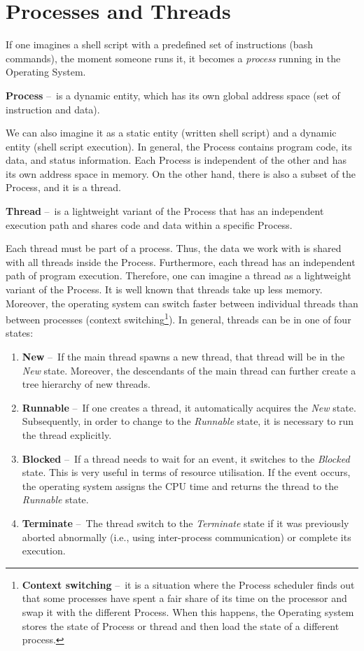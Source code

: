 \section{Processes and Threads}
\label{04:processesandthreads}

If one imagines a shell script with a predefined set of instructions (bash commands), the moment someone runs it, it becomes a \emph{process} running in the Operating System.
\begin{definition}
    \textbf{Process} \---\ is a dynamic entity, which has its own global address space (set of instruction and data).
\end{definition}
We can also imagine it as a static entity (written shell script) and a dynamic entity (shell script execution).
In general, the Process contains program code, its data, and status information.
Each Process is independent of the other and has its own address space in memory.
On the other hand, there is also a subset of the Process, and it is a thread.
\begin{definition}
    \textbf{Thread} \---\ is a lightweight variant of the Process that has an independent execution path and shares code and data within a specific Process.
\end{definition}
Each thread must be part of a process.
Thus, the data we work with is shared with all threads inside the Process.
Furthermore, each thread has an independent path of program execution.
Therefore, one can imagine a thread as a lightweight variant of the Process.
It is well known that threads take up less memory.
Moreover, the operating system can switch faster between individual threads than between processes (context switching\footnote {\textbf{Context switching} \---\ it is a situation where the Process scheduler finds out that some processes have spent a fair share of its time on the processor and swap it with the different Process. When this happens, the Operating system stores the state of Process or thread and then load the state of a different process.}). In general, threads can be in one of four states:
\begin{enumerate}[itemsep=1mm, parsep=0pt]
    \item \textbf{New} \---\ If the main thread spawns a new thread, that thread will be in the \emph{New} state.
    Moreover, the descendants of the main thread can further create a tree hierarchy of new threads.
    \item \textbf{Runnable} \---\ If one creates a thread, it automatically acquires the \emph{New} state.
    Subsequently, in order to change to the \emph{Runnable} state, it is necessary to run the thread explicitly.
    \item \textbf {Blocked} \---\ If a thread needs to wait for an event, it switches to the \emph{Blocked} state.
    This is very useful in terms of resource utilisation. If the event occurs, the operating system assigns the CPU time and returns the thread to the \emph{Runnable} state.
    \item \textbf{Terminate} \---\ The thread switch to the \emph {Terminate} state if it was previously aborted abnormally (i.e., using inter-process communication) or complete its execution.
\end{enumerate}

